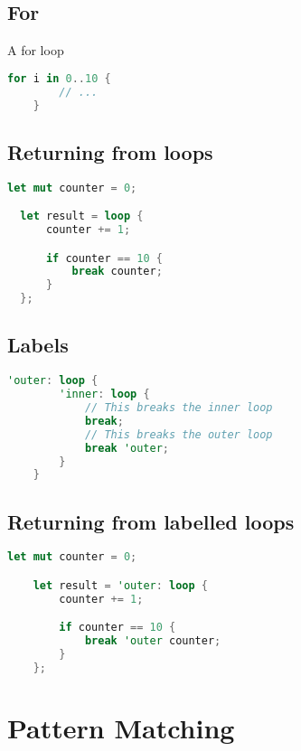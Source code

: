 \documentclass[a4paper]{article}
\begin{document}
\subsection{For}

A for loop

\begin{lstlisting}[language=Rust, style=boxed, numbers=none]
    for i in 0..10 {
        // ...
    }
\end{lstlisting}

\subsection{Returning from loops}

\begin{lstlisting}[language=Rust, style=boxed, numbers=none]
  let mut counter = 0;

  let result = loop {
      counter += 1;

      if counter == 10 {
          break counter;
      }
  };
\end{lstlisting}

\subsection{Labels}

\begin{lstlisting}[language=Rust, style=boxed, numbers=none]
    'outer: loop {
        'inner: loop {
            // This breaks the inner loop
            break;
            // This breaks the outer loop
            break 'outer;
        }
    }
\end{lstlisting}

\subsection{Returning from labelled loops}

\begin{lstlisting}[language=Rust, style=boxed, numbers=none]
    let mut counter = 0;

    let result = 'outer: loop {
        counter += 1;

        if counter == 10 {
            break 'outer counter;
        }
    };
\end{lstlisting}

\section{Pattern Matching}
\end{document}
